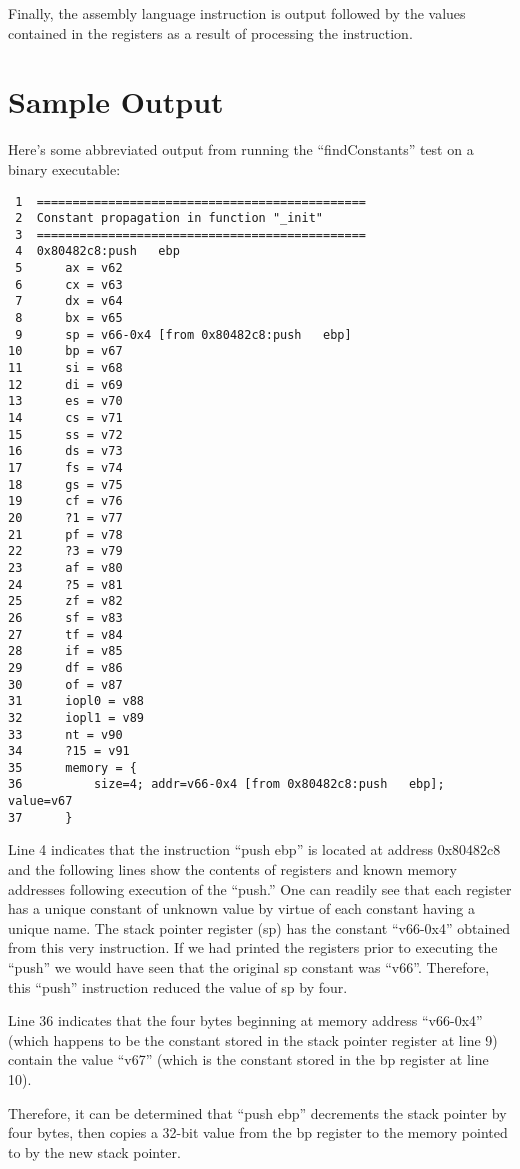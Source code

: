 Finally, the assembly language instruction is output followed by the
values contained in the registers as a result of processing the
instruction.

\section{Sample Output}

Here's some abbreviated output from running the ``findConstants'' test
on a binary executable:

\begin{verbatim}
 1  ==============================================
 2  Constant propagation in function "_init"
 3  ==============================================
 4  0x80482c8:push   ebp
 5      ax = v62
 6      cx = v63
 7      dx = v64
 8      bx = v65
 9      sp = v66-0x4 [from 0x80482c8:push   ebp]
10      bp = v67
11      si = v68
12      di = v69
13      es = v70
14      cs = v71
15      ss = v72
16      ds = v73
17      fs = v74
18      gs = v75
19      cf = v76
20      ?1 = v77
21      pf = v78
22      ?3 = v79
23      af = v80
24      ?5 = v81
25      zf = v82
26      sf = v83
27      tf = v84
28      if = v85
29      df = v86
30      of = v87
31      iopl0 = v88
32      iopl1 = v89
33      nt = v90
34      ?15 = v91
35      memory = {
36          size=4; addr=v66-0x4 [from 0x80482c8:push   ebp]; value=v67
37      }
\end{verbatim}

Line 4 indicates that the instruction ``push ebp'' is located at
address 0x80482c8 and the following lines show the contents of
registers and known memory addresses following execution of the
``push.''  One can readily see that each register has a unique
constant of unknown value by virtue of each constant having a unique
name. The stack pointer register (sp) has the constant ``v66-0x4''
obtained from this very instruction. If we had printed the registers
prior to executing the ``push'' we would have seen that the original
sp constant was ``v66''. Therefore, this ``push'' instruction reduced
the value of sp by four.

Line 36 indicates that the four bytes beginning at memory address
``v66-0x4'' (which happens to be the constant stored in the stack pointer
register at line 9) contain the value ``v67'' (which is the constant
stored in the bp register at line 10).

Therefore, it can be determined that ``push ebp'' decrements the stack
pointer by four bytes, then copies a 32-bit value from the bp register
to the memory pointed to by the new stack pointer.

